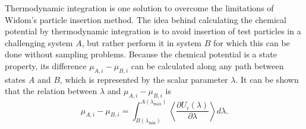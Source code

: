 \documentclass[preprint,12pt]{elsarticle}
\begin{document}
Thermodynamic integration is one solution to overcome the limitations of Widom's particle insertion method. The idea behind calculating the chemical potential by thermodynamic integration is to avoid insertion of test particles in a challenging system $A$, but rather perform it in system $B$ for which this can be done without sampling problems. Because the chemical potential is a state property, its difference $\mu_{A,i}-\mu_{B,i}$ can be calculated along any path between states $A$ and $B$, which is represented by the scalar parameter $\lambda$. It can be shown \cite{fre02} that the relation between $\lambda$ and $\mu_{A,i}-\mu_{B,i}$ is 
\begin{equation}
\mu_{A,i}-\mu_{B,i}=\int_{B(\lambda_\text{min})}^{A(\lambda_\text{max})} \left\langle \frac{\partial U_i(\lambda)}{\partial \lambda} \right\rangle d \lambda. 
\label{eq:thermoint}
\end{equation}
\end{document}
